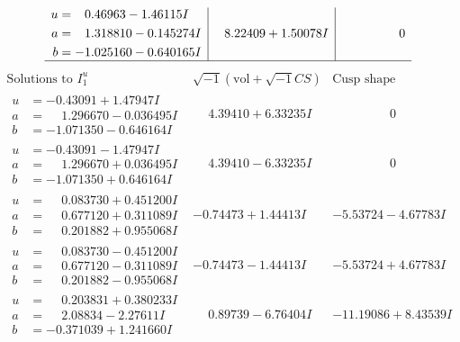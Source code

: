 \documentclass[1p]{elsarticle_modified}
\theoremstyle{definition}
\newcommand{\I}{\sqrt{-1}}
\begin{document}
$$\begin{array}{c|c|c}
\begin{aligned}
u &= \phantom{-}0.46963 - 1.46115 I \\
a &= \phantom{-}1.318810 - 0.145274 I \\
b &= -1.025160 - 0.640165 I\end{aligned}
 & \phantom{-}8.22409 + 1.50078 I & \phantom{-0.000000 } 0\\
 \hline 
 \end{array}$$\newpage$$\begin{array}{c|c|c}  
\text{Solutions to }I^u_{1}& \I (\text{vol} + \sqrt{-1}CS) & \text{Cusp shape}\\
 \hline 
\begin{aligned}
u &= -0.43091 + 1.47947 I \\
a &= \phantom{-}1.296670 - 0.036495 I \\
b &= -1.071350 - 0.646164 I\end{aligned}
 & \phantom{-}4.39410 + 6.33235 I & \phantom{-0.000000 } 0 \\ \hline\begin{aligned}
u &= -0.43091 - 1.47947 I \\
a &= \phantom{-}1.296670 + 0.036495 I \\
b &= -1.071350 + 0.646164 I\end{aligned}
 & \phantom{-}4.39410 - 6.33235 I & \phantom{-0.000000 } 0 \\ \hline\begin{aligned}
u &= \phantom{-}0.083730 + 0.451200 I \\
a &= \phantom{-}0.677120 + 0.311089 I \\
b &= \phantom{-}0.201882 + 0.955068 I\end{aligned}
 & -0.74473 + 1.44413 I & -5.53724 - 4.67783 I \\ \hline\begin{aligned}
u &= \phantom{-}0.083730 - 0.451200 I \\
a &= \phantom{-}0.677120 - 0.311089 I \\
b &= \phantom{-}0.201882 - 0.955068 I\end{aligned}
 & -0.74473 - 1.44413 I & -5.53724 + 4.67783 I \\ \hline\begin{aligned}
u &= \phantom{-}0.203831 + 0.380233 I \\
a &= \phantom{-}2.08834 - 2.27611 I \\
b &= -0.371039 + 1.241660 I\end{aligned}
 & \phantom{-}0.89739 - 6.76404 I & -11.19086 + 8.43539 I \\ \hline\begin{aligned}

\end{aligned}
\end{array}$$
\end{document}
